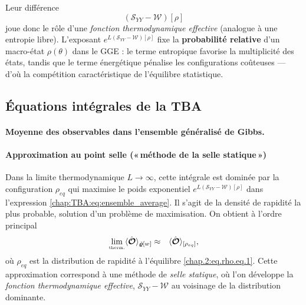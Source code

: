 Leur différence
\[
(\mathcal{S}_{YY}-\mathcal{W})[\rho]
\]
joue donc le rôle d’une \emph{fonction thermodynamique effective}
(analogue à une entropie libre).  
L’exposant $e^{L(\mathcal{S}_{YY}-\mathcal{W})[\rho]}$ fixe la \textbf{probabilité relative} d’un
macro-état $\rho(\theta)$ dans le GGE : le terme entropique favorise la
multiplicité des états, tandis que le terme énergétique pénalise les
configurations coûteuses — d’où la compétition caractéristique de
l’équilibre statistique.






%
\subsection{Équations intégrales de la TBA}

\paragraph{Moyenne des observables dans l’ensemble généralisé de Gibbs.}

\paragraph{Approximation au point selle («\,méthode de la selle statique\,»)}

Dans la limite thermodynamique \( L \to \infty \), cette intégrale est dominée par la configuration \( \rho_{eq} \) qui maximise le poids exponentiel $e^{L(\mathcal{S}_{YY}-\mathcal{W})[\rho]}$  dans l'expression \eqref{chap:TBA:eq:ensemble_average}. Il s’agit de la densité de rapidité la plus probable, solution d’un problème de maximisation. On obtient à l’ordre principal
\begin{eqnarray}
	\underset{\mbox{\tiny therm.}}{\lim} \langle \hat{\bm{\mathcal{O}}} \rangle_{\hat{\bm{\varrho}}[w]} & \approx &  \langle\hat{\bm{\mathcal{O}}}\rangle_{[\rho_{eq} ]},	
	\label{chap:TBA:eq:ensemble_average:approx}
\end{eqnarray}
où $\rho_{eq}$ est la distribution de rapidité à l'équilibre \eqref{chap.2:eq.rho.eq.1}.
Cette approximation correspond à une méthode de \textit{selle statique}, où l’on développe la \emph{fonction thermodynamique effective}, $\mathcal{S}_{YY}-\mathcal{W}$  au voisinage de la distribution dominante.


